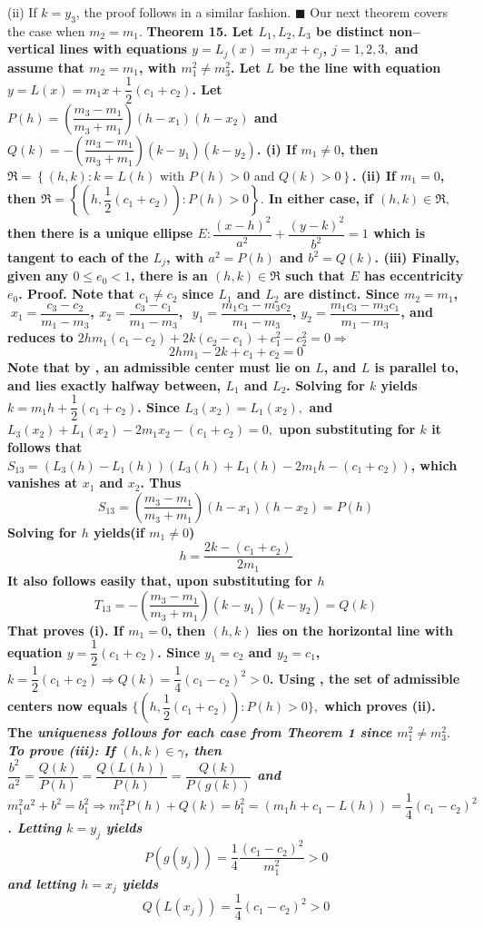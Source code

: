 (ii) If $k=y_{3}$, the proof follows in a similar fashion. $\blacksquare$ \nl 
Our next theorem covers the case when $m_{2}=m_{1}.$ 
\nl \nl \bf Theorem 15. \rm 
Let $L_{1},L_{2},L_{3}$ be distinct non--vertical lines with equations $y=L_{j}(x)=m_{j}x+c_{j}$, $j=1,2,3,$ and assume that $m_{2}=m_{1}$, with $m_{1}^{2}\neq m_{3}^{2}$. Let $L$ be the line with equation $y=L(x)=m_{1}x+\dfrac{1}{2}(c_{1}+c_{2})$. Let $P(h)=\left( \dfrac{m_{3}-m_{1}}{m_{3}+m_{1}}\right) (h-x_{1})(h-x_{2})$ and $Q(k)=-\left( \dfrac{m_{3}-m_{1}}{m_{3}+m_{1}}\right) (k-y_{1})(k-y_{2})$. \nl
(i) If $m_{1}\neq 0$, then $\Re =\left\{ (h,k):k=L(h)\text{ with }P(h)>0\text{ and }Q(k)>0\right\} $. \nl	
(ii) If $m_{1}=0$, then $\Re =\left\{ (h,\dfrac{1}{2}(c_{1}+c_{2})): P(h)>0 \right\} .$ \nl
In either case, if $(h,k)\in \Re ,$ then there is a unique ellipse $E:\dfrac{(x-h)^{2}}{a^{2}}+\dfrac{(y-k)^{2}}{b^{2}}=1$ which is tangent to each of the $L_{j}$, with $a^{2}=P(h)$ and $b^{2}=Q(k)$. \nl
(iii) Finally, given any $0\leq e_{0}<1$, there is an $(h,k)\in \Re $ such that $E$ has eccentricity $e_{0}$. 
\nl \bf Proof. \rm Note that $c_{1}\neq c_{2}$ since $L_{1}$ and $L_{2}$ are distinct. Since $m_{2}=m_{1}$,$\;x_{1}=\allowbreak \dfrac{c_{3}-c_{2}}{m_{1}-m_{3}}$, $x_{2}=\allowbreak \dfrac{c_{3}-c_{1}}{m_{1}-m_{3}}$, $\allowbreak $ $y_{1}=\allowbreak \dfrac{m_{1}c_{3}-m_{3}c_{2}}{m_{1}-m_{3}}$, $y_{2}=\allowbreak \dfrac{m_{1}c_{3}-m_{3}c_{1}}{m_{1}-m_{3}}$, and   reduces to $\allowbreak 2hm_{1}(c_{1}-c_{2})+2k(c_{2}-c_{1})+c_{1}^{2}-c_{2}^{2}=0\Rightarrow $ $$2hm_{1}-2k+c_{1}+c_{2}=0\tag{60}$$ Note that by 
, an admissible center must lie on $L$, and $L$ is parallel to, and lies exactly halfway between, $L_{1}$ and $L_{2}$. Solving  for $k$ yields $k=m_{1}h+\dfrac{1}{2}(c_{1}+c_{2})$. Since $L_{3}(x_{2})=L_{1}(x_{2}),$ and $L_{3}(x_{2})+L_{1}(x_{2})-2m_{1}x_{2}-(c_{1}+c_{2})=0,$ upon substituting for $k$ it follows that $S_{13}=(L_{3}(h)-L_{1}(h))(L_{3}(h)+L_{1}(h)-2m_{1}h-(c_{1}+c_{2}))$, which vanishes at $x_{1}$ and $x_{2}$. Thus $$S_{13}=\left( \dfrac{m_{3}-m_{1}}{m_{3}+m_{1}}\right) (h-x_{1})(h-x_{2})=P(h)\tag{61}$$ 
Solving  for $h$ yields(if $m_{1}\neq 0$) $$h=\dfrac{2k-(c_{1}+c_{2})}{2m_{1}}$$ It also follows easily that, upon substituting for $h\allowbreak $ $$T_{13}=-\left( \dfrac{m_{3}-m_{1}}{m_{3}+m_{1}}\right) (k-y_{1})(k-y_{2})=Q(k)\tag{62}$$ That proves (i). If $m_{1}=0$, then $(h,k)$ lies on the horizontal line with equation $y=\dfrac{1}{2}(c_{1}+c_{2})$. Since $y_{1}=c_{2}$ and $y_{2}=c_{1}$, $k=\dfrac{1}{2}(c_{1}+c_{2})\Rightarrow Q(k)=\dfrac{1}{4}(c_{1}-c_{2})^{2}>0$. Using , the set of admissible centers now equals $\{(h,\dfrac{1}{2}(c_{1}+c_{2})):P(h)>0\},$ which proves (ii). The \it uniqueness \rm follows for each case from Theorem 1 since $m_{1}^{2}\neq m_{3}^{2}.$ To prove (iii): If $(h,k)\in \gamma $, then $\dfrac{b^{2}}{a^{2}}=\dfrac{Q(k)}{P(h)}=\dfrac{Q(L(h))}{P(h)}=\dfrac{Q(k)}{P(g(k))}$ and $m_{1}^{2}a^{2}+b^{2}=b_{1}^{2}\Rightarrow m_{1}^{2}P(h)+Q(k)=b_{1}^{2}=(m_{1}h+c_{1}-L(h))=\dfrac{1}{4}\left( c_{1}-c_{2}\right) ^{2}$. Letting $k=y_{j}$ yields $$P(g(y_{j}))=\dfrac{1}{4}\frac{\left( c_{1}-c_{2}\right) ^{2}}{m_{1}^{2}}>0\tag{63}$$ and letting $h=x_{j}$ yields $$Q(L(x_{j}))=\dfrac{1}{4}\left( c_{1}-c_{2}\right) ^{2}>0\tag{64}$$ 
